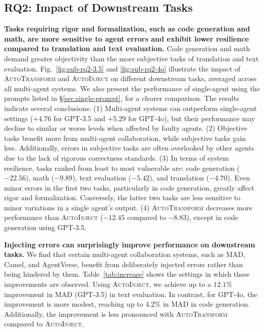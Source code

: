 \documentclass{article}
\theoremstyle{plain}
\theoremstyle{definition}
\theoremstyle{remark}
\begin{document}
\subsection{RQ2: Impact of Downstream Tasks}
\label{sec:rq2}

\textbf{Tasks requiring rigor and formalization, such as code generation and math, are more sensitive to agent errors and exhibit lower resilience compared to translation and text evaluation.}
Code generation and math demand greater objectivity than the more subjective tasks of translation and text evaluation.
Fig.~\ref{fig:sub-rq2-3.5} and \ref{fig:sub-rq2-4o} illustrate the impact of \textsc{AutoTransform} and \textsc{AutoInject} on different downstream tasks, averaged across all multi-agent systems.
We also present the performance of single-agent using the prompts listed in \S\ref{sec:single-prompt}, for a clearer comparison.
The results indicate several conclusions:
(1) Multi-agent systems can outperform single-agent settings ($+4.76$ for GPT-3.5 and $+5.29$ for GPT-4o), but their performance may decline to similar or worse levels when affected by faulty agents.
(2) Objective tasks benefit more from multi-agent collaboration, while subjective tasks gain less.
Additionally, errors in subjective tasks are often overlooked by other agents due to the lack of rigorous correctness standards.
(3) In terms of system resilience, tasks ranked from least to most vulnerable are: code generation ($-22.56$), math ($-9.89$), text evaluation ($-5.42$), and translation ($-4.70$).
Even minor errors in the first two tasks, particularly in code generation, greatly affect rigor and formalization.
Conversely, the latter two tasks are less sensitive to minor variations in a single agent's output.
(4) \textsc{AutoTransform} decreases more performance than \textsc{AutoInject} ($-12.45$ compared to $-8.83$), except in code generation using GPT-3.5.

\textbf{Injecting errors can surprisingly improve performance on downstream tasks.}
We find that certain multi-agent collaboration systems, such as MAD, Camel, and AgentVerse, benefit from deliberately injected errors rather than being hindered by them.
Table~\ref{tab:increase} shows the settings in which these improvements are observed.
Using \textsc{AutoInject}, we achieve up to a $12.1\%$ improvement in MAD (GPT-3.5) in text evaluation.
In contrast, for GPT-4o, the improvement is more modest, reaching up to $4.2\%$ in MAD in code generation.
Additionally, the improvement is less pronounced with \textsc{AutoTransform} compared to \textsc{AutoInject}.
\end{document}
